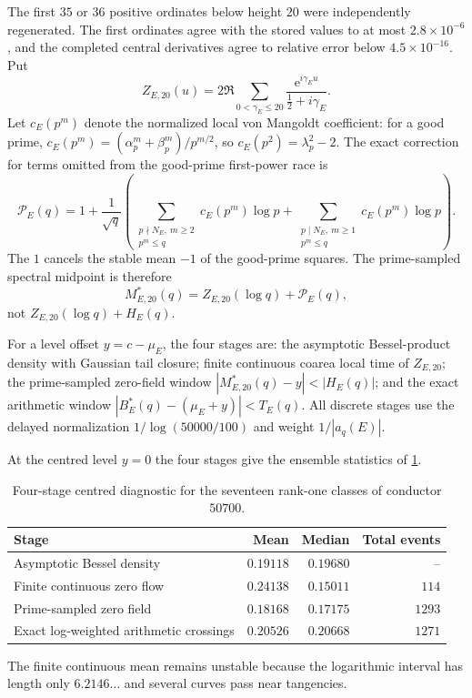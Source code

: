 \documentclass[11pt,reqno]{amsart}
\theoremstyle{remark}
\newcommand{\e}{\mathrm{e}}
\begin{document}
The first $35$ or $36$ positive ordinates below height $20$ were independently regenerated.  The first ordinates agree with the stored values to at most $2.8\times10^{-6}$, and the completed central derivatives agree to relative error below $4.5\times10^{-16}$.  Put
\begin{equation}
  Z_{E,20}(u)
  =2\Re\sum_{0<\gamma_E\le20}
   \frac{\e^{i\gamma_Eu}}{\tfrac12+i\gamma_E}.
  \label{eq:truncated-zero-field}
\end{equation}
Let $c_E(p^m)$ denote the normalized local von Mangoldt coefficient: for a good prime, $c_E(p^m)=(\alpha_p^m+\beta_p^m)/p^{m/2}$, so $c_E(p^2)=\lambda_p^2-2$.  The exact correction for terms omitted from the good-prime first-power race is
\begin{equation}
  \mathcal P_E(q)
  =1+\frac1{\sqrt q}\left(
  \sum_{\substack{p\nmid N_E,\ m\ge2\\p^m\le q}}c_E(p^m)\log p
  +\sum_{\substack{p\mid N_E,\ m\ge1\\p^m\le q}}c_E(p^m)\log p
  \right).
  \label{eq:prime-power-correction}
\end{equation}
The $1$ cancels the stable mean $-1$ of the good-prime squares.  The prime-sampled spectral midpoint is therefore
\begin{equation}
  M_{E,20}^{*}(q)=Z_{E,20}(\log q)+\mathcal P_E(q),
  \label{eq:spectral-midpoint}
\end{equation}
not $Z_{E,20}(\log q)+H_E(q)$.

For a level offset $y=c-\mu_E$, the four stages are: the asymptotic Bessel-product density with Gaussian tail closure; finite continuous coarea local time of $Z_{E,20}$; the prime-sampled zero-field window $|M_{E,20}^{*}(q)-y|<|H_E(q)|$; and the exact arithmetic window $|B_E^{*}(q)-(\mu_E+y)|<T_E(q)$.  All discrete stages use the delayed normalization $1/\log(50000/100)$ and weight $1/|a_q(E)|$.

At the centred level $y=0$ the four stages give the ensemble statistics of \cref{tab:50700-four-stage-centre}.
\begin{table}[H]
\centering
\small
\caption{Four-stage centred diagnostic for the seventeen rank-one classes of conductor $50700$.}
\label{tab:50700-four-stage-centre}
\begin{tabular}{@{}lrrr@{}}
\toprule
Stage & Mean & Median & Total events\\
\midrule
Asymptotic Bessel density & $0.19118$ & $0.19680$ & --\\
Finite continuous zero flow & $0.24138$ & $0.15011$ & $114$\\
Prime-sampled zero field & $0.18168$ & $0.17175$ & $1293$\\
Exact log-weighted arithmetic crossings & $0.20526$ & $0.20668$ & $1271$\\
\bottomrule
\end{tabular}
\end{table}
The finite continuous mean remains unstable because the logarithmic interval has length only $6.2146\ldots$ and several curves pass near tangencies.
\end{document}
